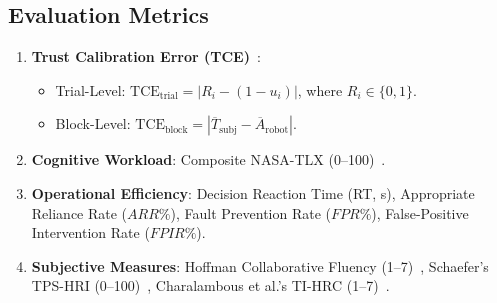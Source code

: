\documentclass[conference]{IEEEtran}
\begin{document}
\subsection{Evaluation Metrics}
\begin{enumerate}
    \item \textbf{Trust Calibration Error (TCE)}~\cite{lee2004trust}:
    \begin{itemize}
        \item Trial-Level: $\text{TCE}_{\text{trial}} = |R_i - (1 - u_i)|$, where $R_i \in \{0, 1\}$.
        \item Block-Level: $\text{TCE}_{\text{block}} = |\overline{T}_{\text{subj}} - \overline{A}_{\text{robot}}|$.
    \end{itemize}
    \item \textbf{Cognitive Workload}: Composite NASA-TLX (0--100)~\cite{hart1988development}.
    \item \textbf{Operational Efficiency}: Decision Reaction Time (RT, s), Appropriate Reliance Rate ($ARR\%$), Fault Prevention Rate ($FPR\%$), False-Positive Intervention Rate ($FPIR\%$).
    \item \textbf{Subjective Measures}: Hoffman Collaborative Fluency (1--7)~\cite{hoffman2019evaluating}, Schaefer's TPS-HRI (0--100)~\cite{schaefer2016measuring}, Charalambous et al.'s TI-HRC (1--7)~\cite{charalambous2016development}.
\end{enumerate}
\end{document}
